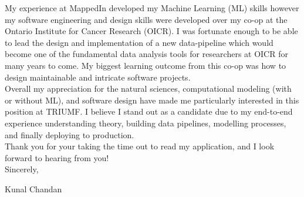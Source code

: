 \documentclass[]{chandan-cv}
\begin{document}
\begin{minipage}[t]{0.8\textwidth}
\qquad My experience at MappedIn developed my Machine Learning (ML) skills however my software engineering and design skills were developed over my co-op at the Ontario Institute for Cancer Research (OICR). 
I was fortunate enough to be able to lead the design and implementation of a new data-pipeline which would become one of the fundamental data analysis tools for researchers at OICR for many years to come. 
My biggest learning outcome from this co-op was how to design maintainable and intricate software projects.
\\


\qquad Overall my appreciation for the natural sciences, computational modeling (with or without ML), and software design have made me particularly interested in this position at TRIUMF. 
I believe I stand out as a candidate due to my end-to-end experience understanding theory, building data pipelines, modelling processes, and finally deploying to production. 
\\


\qquad Thank you for your taking the time out to read my application, and I look forward to hearing from you!
\\


\qquad Sincerely,

\qquad Kunal Chandan
\\
\end{minipage}

%
%
\end{document}
